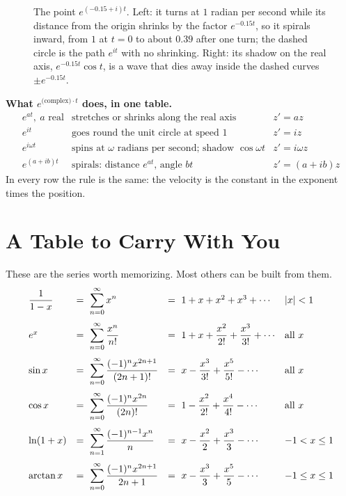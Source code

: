 \begin{figure}[htbp]
\caption{The point $e^{(-0.15 + i)t}$. Left: it turns at $1$ radian per second while its distance from the origin shrinks by the factor $e^{-0.15t}$, so it spirals inward, from $1$ at $t=0$ to about $0.39$ after one turn; the dashed circle is the path $e^{it}$ with no shrinking. Right: its shadow on the real axis, $e^{-0.15t}\cos t$, is a wave that dies away inside the dashed curves $\pm e^{-0.15t}$.}
\label{ch30:fig-spiral}
\end{figure}

\begin{focusbox}
\textbf{What $e^{\text{(complex)}\cdot t}$ does, in one table.}
\[
\begin{array}{lll}
  e^{at},\ a \text{ real} & \text{stretches or shrinks along the real axis} & z' = a z\\[3pt]
  e^{it} & \text{goes round the unit circle at speed } 1 & z' = i z\\[3pt]
  e^{i\omega t} & \text{spins at } \omega \text{ radians per second; shadow } \cos\omega t & z' = i\omega z\\[3pt]
  e^{(a+ib)t} & \text{spirals: distance } e^{at}\text{, angle } bt & z' = (a+ib) z
\end{array}
\]
In every row the rule is the same: the velocity is the constant in the exponent times the position.
\end{focusbox}

\section{A Table to Carry With You}
\label{ch30:sec-table}

These are the series worth memorizing. Most others can be built from them.
\[
\begin{array}{llll}
\dfrac{1}{1-x} &=\ \displaystyle\sum_{n=0}^{\infty} x^n &=\ 1 + x + x^2 + x^3 + \cdots & \lvert x\rvert<1 \\[1.6em]
e^x &=\ \displaystyle\sum_{n=0}^{\infty} \dfrac{x^n}{n!} &=\ 1 + x + \dfrac{x^2}{2!} + \dfrac{x^3}{3!} + \cdots & \text{all } x \\[1.6em]
\sin x &=\ \displaystyle\sum_{n=0}^{\infty} \dfrac{(-1)^n x^{2n+1}}{(2n+1)!} &=\ x - \dfrac{x^3}{3!} + \dfrac{x^5}{5!} - \cdots & \text{all } x \\[1.6em]
\cos x &=\ \displaystyle\sum_{n=0}^{\infty} \dfrac{(-1)^n x^{2n}}{(2n)!} &=\ 1 - \dfrac{x^2}{2!} + \dfrac{x^4}{4!} - \cdots & \text{all } x \\[1.6em]
\ln(1+x) &=\ \displaystyle\sum_{n=1}^{\infty} \dfrac{(-1)^{n-1} x^n}{n} &=\ x - \dfrac{x^2}{2} + \dfrac{x^3}{3} - \cdots & -1 < x \le 1 \\[1.6em]
\arctan x &=\ \displaystyle\sum_{n=0}^{\infty} \dfrac{(-1)^n x^{2n+1}}{2n+1} &=\ x - \dfrac{x^3}{3} + \dfrac{x^5}{5} - \cdots & -1 \le x \le 1
\end{array}
\]


